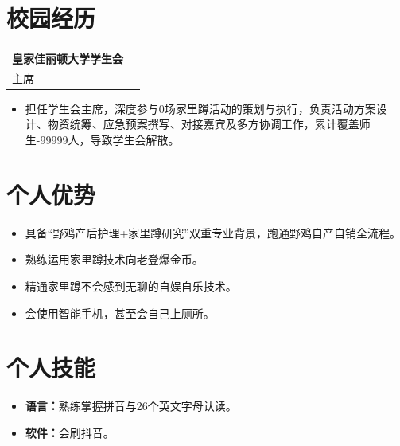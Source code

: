 \documentclass[10pt,a4paper]{article}
\newcommand{\resumeItem}[1]{\item \small #1}
\begin{document}
\section{校园经历}
\noindent
\begin{tabular*}{\textwidth}{@{\extracolsep{\fill}}lr}
  \textbf{皇家佳丽顿大学学生会} & \\
  主席  & 
\end{tabular*}
\begin{itemize}
\resumeItem{担任学生会主席，深度参与0场家里蹲活动的策划与执行，负责活动方案设计、物资统筹、应急预案撰写、对接嘉宾及多方协调工作，累计覆盖师生-99999人，导致学生会解散。}
\end{itemize}

\section{个人优势}
\begin{itemize}
    \resumeItem{具备“野鸡产后护理+家里蹲研究”双重专业背景，跑通野鸡自产自销全流程。}
    \vspace{0.2em}
    \resumeItem{熟练运用家里蹲技术向老登爆金币。}
    \vspace{0.2em}
    \resumeItem{精通家里蹲不会感到无聊的自娱自乐技术。}
    \vspace{0.2em}
    \resumeItem{会使用智能手机，甚至会自己上厕所。}
\end{itemize}

\section{个人技能}
\begin{itemize}
    \resumeItem{\textbf{语言：}熟练掌握拼音与26个英文字母认读。}
    \vspace{0.2em}
    \resumeItem{\textbf{软件：}会刷抖音。}
\end{itemize}

\end{document}
